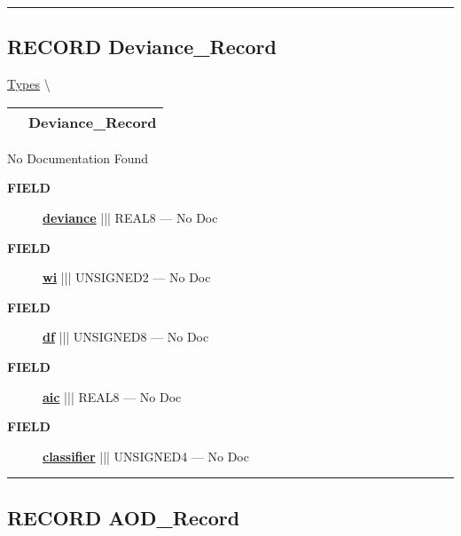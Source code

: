 \rule{\linewidth}{0.5pt}
\subsection*{\textsf{\colorbox{headtoc}{\color{white} RECORD}
Deviance\_Record}}

\hypertarget{ecldoc:logisticregression.types.deviance_record}{}
\hspace{0pt} \hyperlink{ecldoc:LogisticRegression.Types}{Types} \textbackslash 

{\renewcommand{\arraystretch}{1.5}
\begin{tabularx}{\textwidth}{|>{\raggedright\arraybackslash}l|X|}
\hline
\hspace{0pt}\mytexttt{\color{red} } & \textbf{Deviance\_Record} \\
\hline
\end{tabularx}
}

\par





No Documentation Found







\par
\begin{description}
\item [\colorbox{tagtype}{\color{white} \textbf{\textsf{FIELD}}}] \textbf{\underline{deviance}} ||| REAL8 --- No Doc
\item [\colorbox{tagtype}{\color{white} \textbf{\textsf{FIELD}}}] \textbf{\underline{wi}} ||| UNSIGNED2 --- No Doc
\item [\colorbox{tagtype}{\color{white} \textbf{\textsf{FIELD}}}] \textbf{\underline{df}} ||| UNSIGNED8 --- No Doc
\item [\colorbox{tagtype}{\color{white} \textbf{\textsf{FIELD}}}] \textbf{\underline{aic}} ||| REAL8 --- No Doc
\item [\colorbox{tagtype}{\color{white} \textbf{\textsf{FIELD}}}] \textbf{\underline{classifier}} ||| UNSIGNED4 --- No Doc
\end{description}





\rule{\linewidth}{0.5pt}
\subsection*{\textsf{\colorbox{headtoc}{\color{white} RECORD}
AOD\_Record}}

